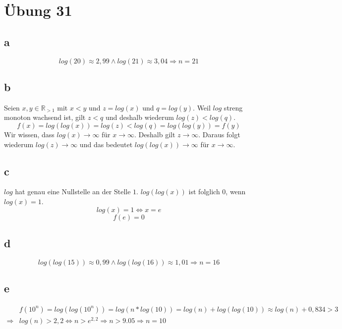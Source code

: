 \documentclass[a4paper,10pt]{article}
\begin{document}
\section*{Übung 31}

\subsection*{a}

\begin{equation}
 log(20) \approx 2,99 \land log(21) \approx 3,04 \Rightarrow n = 21
\end{equation}

\subsection*{b}

Seien $x, y \in \mathbb{R}_{> 1}$ mit $x < y$ und $z = log(x)$ und $q = log(y)$.
Weil $log$ streng monoton wachsend ist, gilt $z < q$ und deshalb wiederum $log(z) < log(q)$.
\begin{equation}
 f(x) = log(log(x)) = log(z) < log(q) = log(log(y)) = f(y)
\end{equation}
Wir wissen, dass $log(x) \rightarrow \infty$ für $x \rightarrow \infty$.
Deshalb gilt $z \rightarrow \infty$.
Daraus folgt wiederum $log(z) \rightarrow \infty$ und das bedeutet $log(log(x)) \rightarrow \infty$ für $x \rightarrow \infty$.

\subsection*{c}

$log$ hat genau eine Nullstelle an der Stelle $1$.
$log(log(x))$ ist folglich $0$, wenn $log(x) = 1$.
\begin{equation}
 log(x) = 1 \Leftrightarrow x = e
\end{equation}
\begin{equation}
 f(e) = 0
\end{equation}

\subsection*{d}

\begin{equation}
 log(log(15)) \approx 0,99 \land log(log(16)) \approx 1,01 \Rightarrow n = 16
\end{equation}

\subsection*{e}

\begin{align}
 & f(10^n) = log(log(10^n)) = log(n * log(10)) = log(n) + log(log(10)) \approx log(n) + 0,834 > 3\\
 \Rightarrow & log(n) > 2,2 \Leftrightarrow n > e^{2,2} \Rightarrow n > 9.05 \Rightarrow n = 10
\end{align}
\end{document}
